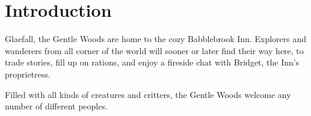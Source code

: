 \chapter{Introduction}

 Glaefall, the Gentle Woods are home to the cozy Babblebrook Inn.
Explorers and wanderers from all corner of the world will sooner or later find their way here, to trade stories, fill up on rations, and enjoy a fireside chat with Bridget, the Inn's proprietress.

Filled with all kinds of creatures and critters, the Gentle Woods welcome any number of different peoples.
